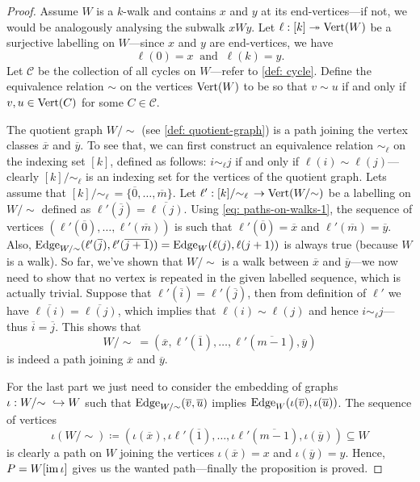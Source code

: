 \begin{proof}
Assume \(W\) is a \(k\)-walk and contains \(x\) and \(y\) at its
end-vertices---if not, we would be analogously analysing the subwalk
\(xWy\). Let \(\ell: [k] \twoheadrightarrow \operatorname{Vert}(W)\) be a surjective labelling on
\(W\)---since \(x\) and \(y\) are end-vertices, we have
\begin{equation}\label{eq: paths-on-walks-1}
  \ell(0) = x\ \text{ and }\ \ell(k) = y.
\end{equation}
Let \(\mathcal C\) be the
collection of all cycles on \(W\)---refer to \cref{def: cycle}. Define the
equivalence relation \(\sim\) on the vertices \(\operatorname{Vert}(W)\) to be so that \(v \sim
u\) if and only if \(v, u \in \operatorname{Vert}(C)\) for some \(C \in \mathcal C\).

The quotient graph \(W/{\sim}\) (see \cref{def: quotient-graph}) is a path
joining the vertex classes \(\overline x\) and \(\overline y\). To see that, we
can first construct an equivalence relation \(\sim_\ell\) on the indexing set
\([k]\), defined as follows: \(i \sim_\ell j\) if and only if
\(\ell(i) \sim \ell(j)\)---clearly \([k]/{\sim_\ell}\) is an indexing set for
the vertices of the quotient graph. Lets assume that
\([k]/{\sim_\ell}\, = \{\overline 0, \dots, \overline m\}\). Let
\(\ell': [k]/{\sim_\ell}\, \to \operatorname{Vert}(W/{\sim})\) be a labelling on
\(W/{\sim}\) defined as \(\ell'(\overline j) = \overline{\ell(j)}\). Using
\cref{eq: paths-on-walks-1}, the sequence of vertices
\((\ell'(\overline 0), \dots, \ell'(\overline m))\) is such that
\(\ell'(\overline 0) = \overline x\) and \(\ell'(\overline m) = \overline y\).
Also,
\(\operatorname{Edge}_{W/{\sim}}(\ell'(\overline j), \ell'(\overline{j + 1})) = \operatorname{Edge}_W(\ell(j),
\ell(j+1))\) is always true (because \(W\) is a walk). So far, we've shown that
\(W/{\sim}\) is a walk between \(\overline x\) and \(\overline y\)---we now
need to show that no vertex is repeated in the given labelled sequence, which is
actually trivial. Suppose that \(\ell'(\overline i) = \ell'(\overline j)\), then
from definition of \(\ell'\) we have
\(\overline{\ell(i)} = \overline{\ell(j)}\), which implies that
\(\ell(i) \sim \ell(j)\) and hence \(i \sim_\ell j\)---thus
\(\overline i = \overline j\). This shows that
\[
  W/{\sim}\ = (\overline x, \ell'(\overline 1), \dots, \ell'(\overline{m - 1}),
  \overline y)
\]
is indeed a path joining \(\overline x\) and \(\overline y\).

For the last part we just need to consider the embedding of graphs \(\iota: W/{\sim}\
\hookrightarrow W\) such that \(\operatorname{Edge}_{W/{\sim}}(\overline v, \overline u)\) implies
\(\operatorname{Edge}_W(\iota(\overline v), \iota(\overline u))\). The sequence of vertices
\[
  \iota(W/{\sim}) \coloneqq (\iota(\overline x), \iota\ell'(\overline 1), \dots,
  \iota \ell'(\overline{m-1}), \iota(\overline y)) \subseteq W
\]
is clearly a path on \(W\) joining the vertices \(\iota(\overline x) = x\) and
\(\iota(\overline y) = y\). Hence, \(P = W[\operatorname{im} \iota]\) gives us the wanted
path---finally the proposition is proved.
\end{proof}

